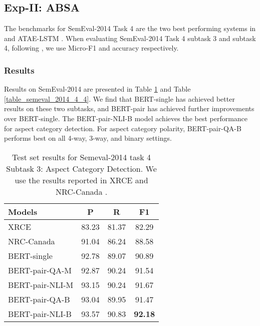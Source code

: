\documentclass[11pt,a4paper]{article}
\theoremstyle{definition}
\begin{document}
	\subsection{Exp-II: ABSA}

	The benchmarks for SemEval-2014 Task 4 are the two best performing systems in \citet{S14-2004} and ATAE-LSTM \cite{wang2016attention}. When evaluating SemEval-2014 Task 4 subtask 3 and subtask 4, following \citet{S14-2004}, we use Micro-F1 and accuracy respectively.
	\subsubsection{Results}
	Results on SemEval-2014 are presented in Table \ref{table_semeval_2014_4_3} and Table \ref{table_semeval_2014_4_4}. We find that BERT-single has achieved better results on these two subtasks, and BERT-pair has achieved further improvements over BERT-single. The BERT-pair-NLI-B model achieves the best performance for aspect category detection. For aspect category polarity, BERT-pair-QA-B performs best on all 4-way, 3-way, and binary settings.
	
	\begin{table}[t!]
		\centering
		\begin{tabular}{l c c c}
			\toprule
			Models & P & R & F1  \\
			\midrule		
			XRCE & 83.23 & 81.37 & 82.29 \\
			NRC-Canada & 91.04 & 86.24 & 88.58 \\
			\midrule
			BERT-single & 92.78 & 89.07 & 90.89 \\
			BERT-pair-QA-M & 92.87 & 90.24 & 91.54 \\
			BERT-pair-NLI-M & 93.15 & 90.24 & 91.67 \\
			BERT-pair-QA-B & 93.04 & 89.95 & 91.47 \\
			BERT-pair-NLI-B & 93.57 & 90.83 & \textbf{92.18} \\
			\bottomrule
		\end{tabular}
		\caption{\label{table_semeval_2014_4_3} Test set results for Semeval-2014 task 4 Subtask 3: Aspect Category Detection. We use the results reported in XRCE \cite{brun2014xrce} and NRC-Canada \cite{kiritchenko2014nrc}.
		}
	\end{table}
	
\end{document}
